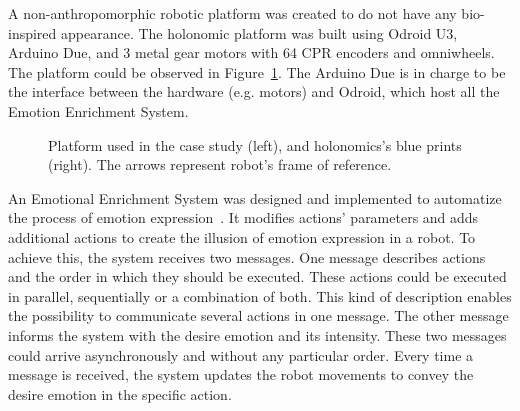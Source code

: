 A non-anthropomorphic robotic platform was created to do not have any bio-inspired appearance. The holonomic platform was built using Odroid U3, Arduino Due, and 3 metal gear motors with 64 CPR encoders and omniwheels. The platform could be observed in Figure~\ref{fig:Robot}. The Arduino Due is in charge to be the interface between the hardware (e.g. motors) and Odroid, which host all the Emotion Enrichment System.

\begin{figure}[t]
\centering%
\hspace{2mm}
\caption{Platform used in the case study (left), and holonomics's blue prints (right). The arrows represent robot's frame of reference.
\label{fig:Robot}}
\end{figure}
An Emotional Enrichment System was designed and implemented to automatize the process of emotion expression~\cite{Angel2017}. It modifies actions' parameters and adds additional actions to create the illusion of emotion expression in a robot. To achieve this, the system receives two messages. One message describes actions and the order in which they should be executed. These actions could be executed in parallel, sequentially or a combination of both. This kind of description enables the possibility to communicate several actions in one message. The other message informs the system with the desire emotion and its intensity. These two messages could arrive asynchronously and without any particular order. Every time a message is received, the system updates the robot movements to convey the desire emotion in the specific action.